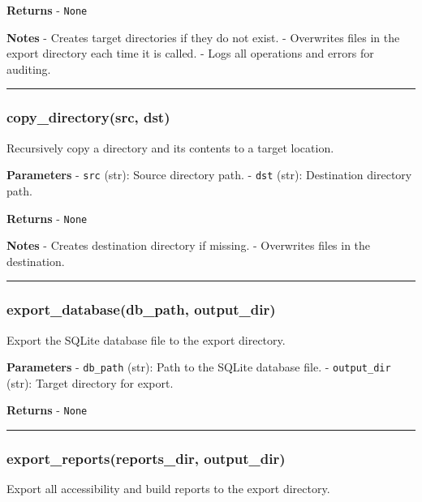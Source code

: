 \textbf{Returns} - \texttt{None}

\textbf{Notes} - Creates target directories if they do not exist. -
Overwrites files in the export directory each time it is called. - Logs
all operations and errors for auditing.

\begin{center}\rule{0.5\linewidth}{0.5pt}\end{center}

\subsubsection{copy\_directory(src, dst)}\label{copy_directorysrc-dst}

Recursively copy a directory and its contents to a target location.

\textbf{Parameters} - \texttt{src} (str): Source directory path. -
\texttt{dst} (str): Destination directory path.

\textbf{Returns} - \texttt{None}

\textbf{Notes} - Creates destination directory if missing. - Overwrites
files in the destination.

\begin{center}\rule{0.5\linewidth}{0.5pt}\end{center}

\subsubsection{export\_database(db\_path,
output\_dir)}\label{export_databasedb_path-output_dir}

Export the SQLite database file to the export directory.

\textbf{Parameters} - \texttt{db\_path} (str): Path to the SQLite
database file. - \texttt{output\_dir} (str): Target directory for
export.

\textbf{Returns} - \texttt{None}

\begin{center}\rule{0.5\linewidth}{0.5pt}\end{center}

\subsubsection{export\_reports(reports\_dir,
output\_dir)}\label{export_reportsreports_dir-output_dir}

Export all accessibility and build reports to the export directory.

